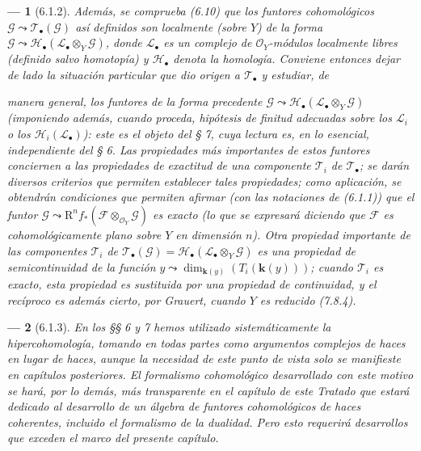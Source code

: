 \documentclass[10pt,oneside,openany]{book}
\theoremstyle{egaenv}\newtheorem*{env}{---}
\theoremstyle{egastatement}
\theoremstyle{egadescription}
\newcommand{\oldpage}[2][]{\marginnote{\normalfont\scriptsize\textbf{#1}\,|\,#2}\ignorespaces}
\begin{document}
\begin{env}[6.1.2]
\label{III.6.1.2}
Además, se comprueba (6.10) que los funtores cohomológicos
$\mathscr G\leadsto\mathscr T_\bullet(\mathscr G)$ así definidos son
\emph{localmente} (sobre $Y$) de la forma
$\mathscr G\leadsto\mathscr H_\bullet(\mathscr L_\bullet\otimes_Y\mathscr G)$,
donde $\mathscr L_\bullet$ es un complejo de $\mathscr O_Y$-módulos
\emph{localmente libres} (definido salvo homotopía) y $\mathscr H_\bullet$ denota la
homología. Conviene entonces dejar de lado la situación particular que dio
origen a $\mathscr T_\bullet$ y estudiar, de

\oldpage[III]{138}

manera general, los funtores de la forma precedente
$\mathscr G\leadsto\mathscr H_\bullet(\mathscr L_\bullet\otimes_Y\mathscr G)$
(imponiendo además, cuando proceda, hipótesis de finitud adecuadas sobre los
$\mathscr L_i$ o los $\mathscr H_i(\mathscr L_\bullet)$): este es el objeto
del § 7, cuya lectura es, en lo esencial, independiente del § 6. Las
propiedades más importantes de estos funtores conciernen a las propiedades de
\emph{exactitud} de una componente $\mathscr T_i$ de $\mathscr T_\bullet$; se darán
diversos criterios que permiten establecer tales propiedades; como
aplicación, se obtendrán condiciones que permiten afirmar (con las notaciones
de (6.1.1)) que el funtor
$\mathscr G\leadsto\mathrm R^n f_*(\mathscr F\otimes_{\mathscr O_Y}\mathscr G)$
es \emph{exacto} (lo que se expresará diciendo que $\mathscr F$ es
\emph{cohomológicamente plano} sobre $Y$ en dimensión $n$). Otra propiedad
importante de las componentes $\mathscr T_i$ de
$\mathscr T_\bullet(\mathscr G)=
\mathscr H_\bullet(\mathscr L_\bullet\otimes_Y\mathscr G)$ es una propiedad
de \emph{semicontinuidad} de la función
$y\leadsto\dim_{\boldsymbol{k}(y)}(T_i(\boldsymbol{k}(y)))$; cuando $\mathscr T_i$ es \emph{exacto}, esta
propiedad es sustituida por una propiedad de \emph{continuidad}, y el recíproco es
además cierto, por Grauert, cuando $Y$ es reducido (7.8.4).
\end{env}

\begin{env}[6.1.3]
\label{III.6.1.3}
En los §§ 6 y 7 hemos utilizado sistemáticamente la \emph{hipercohomología}, tomando
en todas partes como argumentos \emph{complejos} de haces en lugar de haces, aunque
la necesidad de este punto de vista solo se manifieste en capítulos
posteriores. El formalismo cohomológico desarrollado con este motivo se hará,
por lo demás, más transparente en el capítulo de este Tratado que estará
dedicado al desarrollo de un álgebra de funtores cohomológicos de haces
coherentes, incluido el formalismo de la dualidad. Pero esto requerirá
desarrollos que exceden el marco del presente capítulo.
\end{env}
\end{document}
